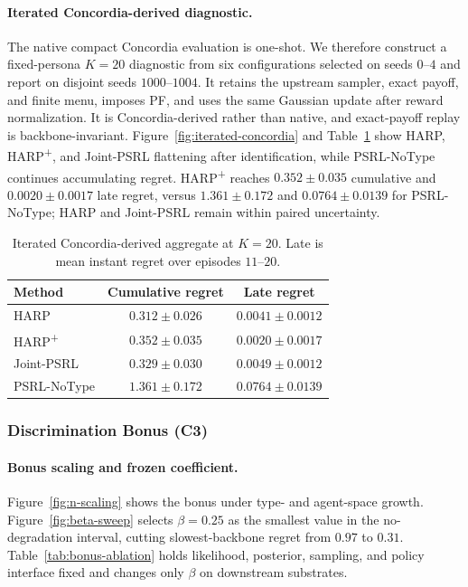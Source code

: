\paragraph{Iterated Concordia-derived diagnostic.}
The native compact Concordia evaluation is one-shot. We therefore construct a fixed-persona $K{=}20$ diagnostic from six configurations selected on seeds $0$--$4$ and report on disjoint seeds $1000$--$1004$. It retains the upstream sampler, exact payoff, and finite menu, imposes PF, and uses the same Gaussian update after reward normalization. It is Concordia-derived rather than native, and exact-payoff replay is backbone-invariant. Figure~\ref{fig:iterated-concordia} and Table~\ref{tab:iterated-concordia} show HARP, HARP\textsuperscript{+}, and Joint-PSRL flattening after identification, while PSRL-NoType continues accumulating regret. HARP\textsuperscript{+} reaches $0.352\pm0.035$ cumulative and $0.0020\pm0.0017$ late regret, versus $1.361\pm0.172$ and $0.0764\pm0.0139$ for PSRL-NoType; HARP and Joint-PSRL remain within paired uncertainty.

\begin{table}[t]
\centering\small
\caption{Iterated Concordia-derived aggregate at $K{=}20$. Late is mean instant regret over episodes $11$--$20$.}
\label{tab:iterated-concordia}
\begin{tabular}{lcc}
\toprule
Method & Cumulative regret & Late regret \\
\midrule
HARP & $0.312\pm0.026$ & $0.0041\pm0.0012$ \\
HARP\textsuperscript{+} & $0.352\pm0.035$ & $0.0020\pm0.0017$ \\
Joint-PSRL & $0.329\pm0.030$ & $0.0049\pm0.0012$ \\
PSRL-NoType & $1.361\pm0.172$ & $0.0764\pm0.0139$ \\
\bottomrule
\end{tabular}
\end{table}

\subsubsection{Discrimination Bonus (C3)}

\paragraph{Bonus scaling and frozen coefficient.}
Figure~\ref{fig:n-scaling} shows the bonus under type- and agent-space growth. Figure~\ref{fig:beta-sweep} selects $\beta=0.25$ as the smallest value in the no-degradation interval, cutting slowest-backbone regret from $0.97$ to $0.31$. Table~\ref{tab:bonus-ablation} holds likelihood, posterior, sampling, and policy interface fixed and changes only $\beta$ on downstream substrates.

